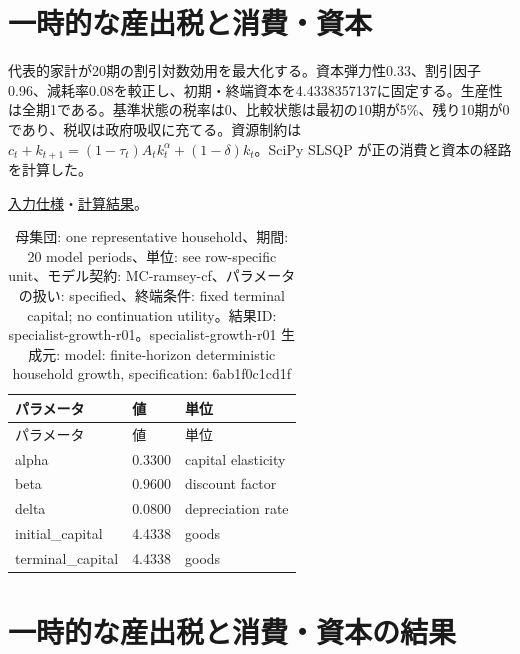 \documentclass[ecta,nameyear,draft]{econsocart}
\begin{document}
\begin{minipage}{\linewidth}

\section{一時的な産出税と消費・資本}\label{result-13}

代表的家計が20期の割引対数効用を最大化する。資本弾力性0.33、割引因子0.96、減耗率0.08を較正し、初期・終端資本を4.4338357137に固定する。生産性は全期1である。基準状態の税率は0、比較状態は最初の10期が5\%、残り10期が0であり、税収は政府吸収に充てる。資源制約は
\(c_t+k_{t+1}=(1-\tau_t)A_t k_t^{\alpha}+(1-\delta)k_t\)。SciPy SLSQP
が正の消費と資本の経路を計算した。

\href{https://github.com/yoshimurahiroki/econ-project-mini/blob/f9093ba87cabce7bee1fdf3391656544617a8cb9/examples/research-workspace/models/growth-spec.json}{入力仕様}・\href{https://github.com/yoshimurahiroki/econ-project-mini/blob/f9093ba87cabce7bee1fdf3391656544617a8cb9/examples/research-workspace/models/growth-result.json}{計算結果}。

\begin{longtable}[]{@{}lll@{}}
\caption{母集団: one representative household、期間: 20 model
periods、単位: see row-specific unit、モデル契約:
MC-ramsey-cf、パラメータの扱い: specified、終端条件: fixed terminal
capital; no continuation utility。結果ID:
specialist-growth-r01。specialist-growth-r01 生成元: model:
finite-horizon deterministic household growth, specification:
6ab1f0c1cd1f}\tabularnewline
\toprule\noalign{}
パラメータ & 値 & 単位 \\
\midrule\noalign{}
\endfirsthead
\toprule\noalign{}
パラメータ & 値 & 単位 \\
\midrule\noalign{}
\endhead
\bottomrule\noalign{}
\endlastfoot
alpha & 0.3300 & capital elasticity \\
beta & 0.9600 & discount factor \\
delta & 0.0800 & depreciation rate \\
initial\_capital & 4.4338 & goods \\
terminal\_capital & 4.4338 & goods \\
\end{longtable}

\end{minipage}

\section{一時的な産出税と消費・資本の結果}\label{result-14}
\end{document}
